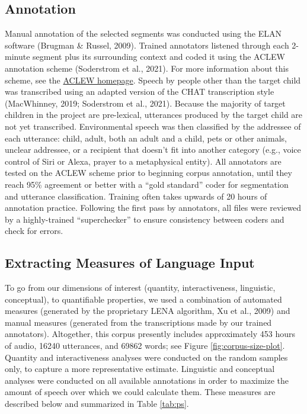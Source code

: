 \documentclass[
  man]{apa6}
\begin{document}
\hypertarget{annotation}{%
\subsection{Annotation}\label{annotation}}

Manual annotation of the selected segments was conducted using the ELAN software (Brugman \& Russel, 2009). Trained annotators listened through each 2-minute segment plus its surrounding context and coded it using the ACLEW annotation scheme (Soderstrom et al., 2021). For more information about this scheme, see the \href{https://sites.google.com/view/aclewdid/home}{ACLEW homepage}. Speech by people other than the target child was transcribed using an adapted version of the CHAT transcription style (MacWhinney, 2019; Soderstrom et al., 2021). Because the majority of target children in the project are pre-lexical, utterances produced by the target child are not yet transcribed. Environmental speech was then classified by the addressee of each utterance: child, adult, both an adult and a child, pets or other animals, unclear addressee, or a recipient that doesn't fit into another category (e.g., voice control of Siri or Alexa, prayer to a metaphysical entity). All annotators are tested on the ACLEW scheme prior to beginning corpus annotation, until they reach 95\% agreement or better with a ``gold standard'' coder for segmentation and utterance classification. Training often takes upwards of 20 hours of annotation practice. Following the first pass by annotators, all files were reviewed by a highly-trained ``superchecker'' to ensure consistency between coders and check for errors.

\hypertarget{extracting-measures-of-language-input}{%
\subsection{Extracting Measures of Language Input}\label{extracting-measures-of-language-input}}

To go from our dimensions of interest (quantity, interactiveness, linguistic, conceptual), to quantifiable properties, we used a combination of automated measures (generated by the proprietary LENA algorithm, Xu et al., 2009) and manual measures (generated from the transcriptions made by our trained annotators). Altogether, this corpus presently includes approximately 453 hours of audio, 16240 utterances, and 69862 words; see Figure \ref{fig:corpus-size-plot}. Quantity and interactiveness analyses were conducted on the random samples only, to capture a more representative estimate. Linguistic and conceptual analyses were conducted on all available annotations in order to maximize the amount of speech over which we could calculate them. These measures are described below and summarized in Table \ref{tab:ps}.
\end{document}
